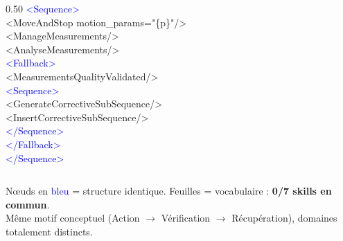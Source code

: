 \documentclass[aspectratio=169]{beamer}
\begin{document}
\begin{frame}[shrink=10]
\begin{columns}[T]
\begin{column}{0.50\textwidth}
      \vspace{0.1em}
      {\ttfamily\scriptsize\noindent%
\textcolor{blue}{<Sequence>}\\[0pt]%
\hspace{0.6em}<MoveAndStop motion\_params="\{p\}"/>\\[0pt]%
\hspace{0.6em}<ManageMeasurements/>\\[0pt]%
\hspace{0.6em}<AnalyseMeasurements/>\\[0pt]%
\hspace{0.6em}\textcolor{blue}{<Fallback>}\\[0pt]%
\hspace{1.2em}<MeasurementsQualityValidated/>\\[0pt]%
\hspace{1.2em}\textcolor{blue}{<Sequence>}\\[0pt]%
\hspace{1.8em}<GenerateCorrectiveSubSequence/>\\[0pt]%
\hspace{1.8em}<InsertCorrectiveSubSequence/>\\[0pt]%
\hspace{1.2em}\textcolor{blue}{</Sequence>}\\[0pt]%
\hspace{0.6em}\textcolor{blue}{</Fallback>}\\[0pt]%
\textcolor{blue}{</Sequence>}%
      }
    \end{column}
  \end{columns}

  \vspace{0.1em}
  \begin{center}
  {\scriptsize
  Nœuds en \textcolor{blue}{bleu} = structure identique. Feuilles = vocabulaire : \textbf{0/7 skills en commun}.\\
  Même motif conceptuel (Action $\to$ Vérification $\to$ Récupération), domaines totalement distincts.}
  \end{center}
\end{frame}
\end{document}
